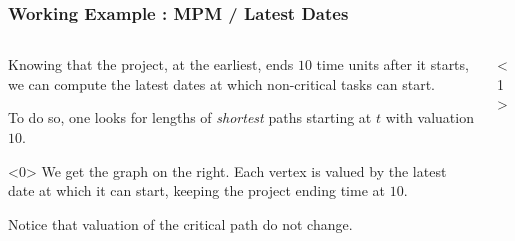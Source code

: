 \documentclass[32pt,aspectratio=169]{beamer}
\begin{document}
\begin{frame}
  \frametitle{Working Example : MPM / Latest Dates}
  \begin{columns}
    \begin{column}{.6\textwidth}
      Knowing that the project, at the earliest, ends $10$ time units
      after it starts, we can compute the latest dates at which
      non-critical tasks can start. 
      
      \vspace{.3\baselineskip}
      To do so, one looks for lengths of \emph{shortest} paths
      starting at $t$ with valuation $10$.      
      
      \begin{uncoverenv}<0>
      \vspace{.3\baselineskip} 
      We get the graph on the right. Each vertex is valued by the
      latest date at which it can start, keeping the project ending
      time at $10$.

      \vspace{.3\baselineskip}
      Notice that valuation of the critical path do not change.
      \end{uncoverenv}
    \end{column}
    \begin{column}{.4\textwidth}
      \begin{onlyenv}<1>
        

\end{onlyenv}
\end{column}
\end{columns}
\end{frame}
\end{document}
